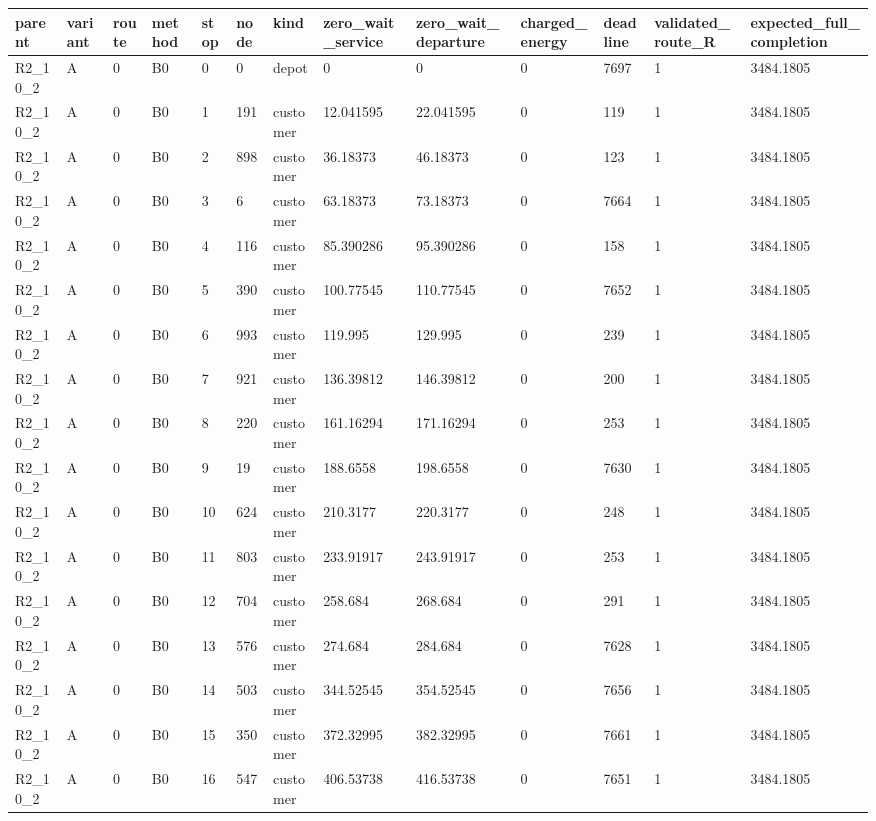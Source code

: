 \begin{longtable}{lllllllllllll}
\hline
parent & variant & route & method & stop & node & kind & zero\_wait\_service & zero\_wait\_departure & charged\_energy & deadline & validated\_route\_R & expected\_full\_completion \\
\hline
R2\_10\_2 & A & 0 & B0 & 0 & 0 & depot & 0 & 0 & 0 & 7697 & 1 & 3484.1805 \\
R2\_10\_2 & A & 0 & B0 & 1 & 191 & customer & 12.041595 & 22.041595 & 0 & 119 & 1 & 3484.1805 \\
R2\_10\_2 & A & 0 & B0 & 2 & 898 & customer & 36.18373 & 46.18373 & 0 & 123 & 1 & 3484.1805 \\
R2\_10\_2 & A & 0 & B0 & 3 & 6 & customer & 63.18373 & 73.18373 & 0 & 7664 & 1 & 3484.1805 \\
R2\_10\_2 & A & 0 & B0 & 4 & 116 & customer & 85.390286 & 95.390286 & 0 & 158 & 1 & 3484.1805 \\
R2\_10\_2 & A & 0 & B0 & 5 & 390 & customer & 100.77545 & 110.77545 & 0 & 7652 & 1 & 3484.1805 \\
R2\_10\_2 & A & 0 & B0 & 6 & 993 & customer & 119.995 & 129.995 & 0 & 239 & 1 & 3484.1805 \\
R2\_10\_2 & A & 0 & B0 & 7 & 921 & customer & 136.39812 & 146.39812 & 0 & 200 & 1 & 3484.1805 \\
R2\_10\_2 & A & 0 & B0 & 8 & 220 & customer & 161.16294 & 171.16294 & 0 & 253 & 1 & 3484.1805 \\
R2\_10\_2 & A & 0 & B0 & 9 & 19 & customer & 188.6558 & 198.6558 & 0 & 7630 & 1 & 3484.1805 \\
R2\_10\_2 & A & 0 & B0 & 10 & 624 & customer & 210.3177 & 220.3177 & 0 & 248 & 1 & 3484.1805 \\
R2\_10\_2 & A & 0 & B0 & 11 & 803 & customer & 233.91917 & 243.91917 & 0 & 253 & 1 & 3484.1805 \\
R2\_10\_2 & A & 0 & B0 & 12 & 704 & customer & 258.684 & 268.684 & 0 & 291 & 1 & 3484.1805 \\
R2\_10\_2 & A & 0 & B0 & 13 & 576 & customer & 274.684 & 284.684 & 0 & 7628 & 1 & 3484.1805 \\
R2\_10\_2 & A & 0 & B0 & 14 & 503 & customer & 344.52545 & 354.52545 & 0 & 7656 & 1 & 3484.1805 \\
R2\_10\_2 & A & 0 & B0 & 15 & 350 & customer & 372.32995 & 382.32995 & 0 & 7661 & 1 & 3484.1805 \\
R2\_10\_2 & A & 0 & B0 & 16 & 547 & customer & 406.53738 & 416.53738 & 0 & 7651 & 1 & 3484.1805 \\

\end{longtable}
